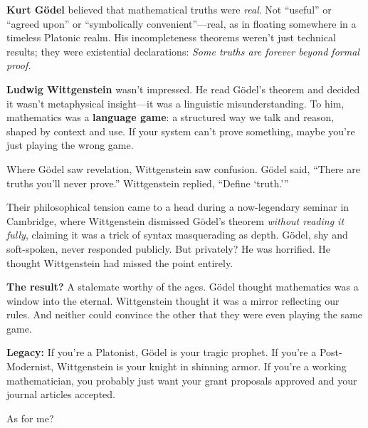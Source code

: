 \begin{tcolorbox}[colback=blue!5!white, colframe=blue!50!black, title=Historical Sidebar: Truth vs Games]

  \textbf{Kurt Gödel} believed that mathematical truths were \emph{real}. Not “useful” or “agreed upon” or “symbolically convenient”—real, as in floating somewhere in a timeless Platonic realm. His incompleteness theorems weren’t just technical results; they were existential declarations: \emph{Some truths are forever beyond formal proof.}
  
  \medskip
  
  \textbf{Ludwig Wittgenstein} wasn’t impressed.  He read Gödel’s theorem and decided it wasn’t metaphysical insight—it was a linguistic misunderstanding. To him, mathematics was a \textbf{language game}: a structured way we talk and reason, shaped by context and use. If your system can’t prove something, maybe you’re just playing the wrong game.
  
  \medskip
  
  Where Gödel saw revelation, Wittgenstein saw confusion. Gödel said, “There are truths you’ll never prove.” Wittgenstein replied, “Define ‘truth.’”
  
  \medskip
  
  Their philosophical tension came to a head during a now-legendary seminar in Cambridge, where Wittgenstein dismissed Gödel’s theorem \emph{without reading it fully}, claiming it was a trick of syntax masquerading as depth. Gödel, shy and soft-spoken, never responded publicly. But privately? He was horrified. He thought Wittgenstein had missed the point entirely.
  
  \medskip
  
  \textbf{The result?} A stalemate worthy of the ages.  Gödel thought mathematics was a window into the eternal.  Wittgenstein thought it was a mirror reflecting our rules.  And neither could convince the other that they were even playing the same game.
  
  \medskip
  
  \textbf{Legacy:}  
  If you're a Platonist, Gödel is your tragic prophet.  If you're a Post-Modernist, Wittgenstein is your knight in shinning armor. If you're a working mathematician, you probably just want your grant proposals approved and your journal articles accepted.
  
\end{tcolorbox}

\medskip

As for me?

